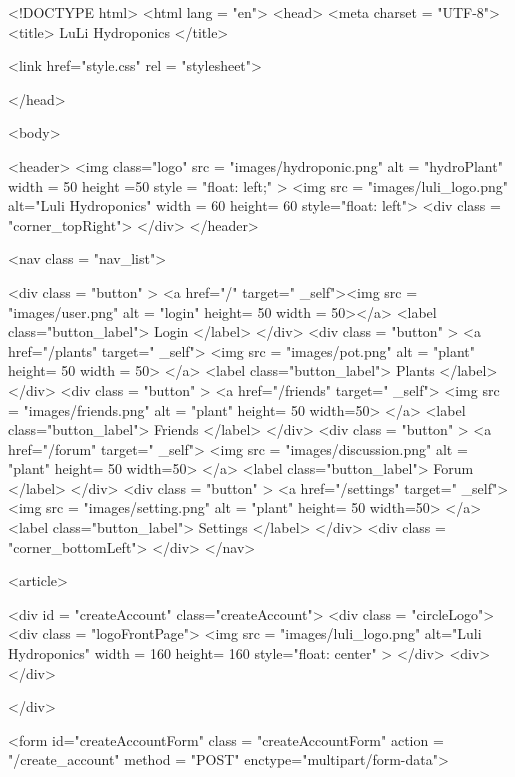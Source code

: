 \documentclass[12pt]{article} %
\begin{document}
\pagebreak

\begin{htmlcode}[caption={Create Account HTML}]
<!DOCTYPE html>
<html lang = "en">
<head>
<meta charset = "UTF-8">
<title> LuLi Hydroponics </title>

<link href="style.css" 
      rel = "stylesheet">

</head>

<body>
 
   <header>
      <img class="logo" src = "images/hydroponic.png" alt = "hydroPlant"  width = 50 height =50 style = "float: left;" >   
      <img src = "images/luli_logo.png" alt="Luli Hydroponics" width = 60 height= 60 style="float: left">
      <div class = "corner_topRight"> </div>
   </header>

   <nav class = "nav_list">
      
    <div class = "button" > 
       <a href="/" target=" _self"><img src = "images/user.png" alt = "login" height= 50 width = 50></a>
       <label class="button_label"> Login </label> 
    </div>
    <div class = "button" > 
       <a href="/plants" target=" _self"> <img src = "images/pot.png" alt = "plant" height= 50 width = 50> </a>
       <label class="button_label"> Plants </label> 
    </div>
    <div class = "button" > 
       <a href="/friends" target=" _self"> <img src = "images/friends.png" alt = "plant" height= 50 width=50> </a>
       <label class="button_label"> Friends </label> 
    </div>
    <div class = "button" > 
       <a href="/forum" target=" _self"> <img src = "images/discussion.png" alt = "plant" height= 50 width=50> </a>
       <label class="button_label"> Forum </label> 
    </div>
    <div class = "button" > 
       <a href="/settings" target=" _self"> <img src = "images/setting.png" alt = "plant" height= 50 width=50> </a>
       <label class="button_label"> Settings </label> 
    </div>
       <div class = "corner_bottomLeft"> </div>
   </nav>
     
<article>
      
      <div id = "createAccount" class="createAccount">
        <div class = "circleLogo">
            <div class = "logoFrontPage">
                <img src = "images/luli_logo.png" alt="Luli Hydroponics" width = 160 height= 160 style="float: center" >
            </div>
            <div></div>

        </div>

        <form id="createAccountForm" class = "createAccountForm" action = "/create_account"  method = "POST" enctype="multipart/form-data">


\end{htmlcode}
\end{document}
